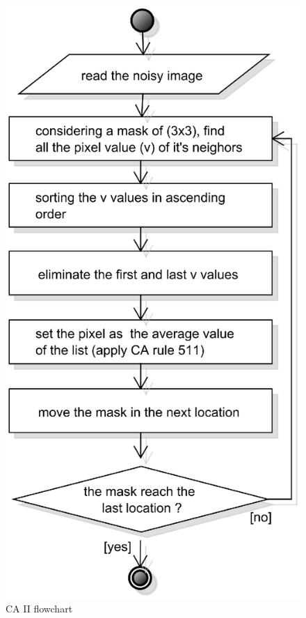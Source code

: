 \begin{minipage}{0.4\textwidth}

\begin{figure}[H]
	\centering
	\includegraphics[width=\textwidth]{images/diagrams/flowchart_CAII}
	\caption{CA II flowchart \cite{bib:filter:CA}}
	\label{fig:diagram:flowchart:CAII}
\end{figure}

\end{minipage}

